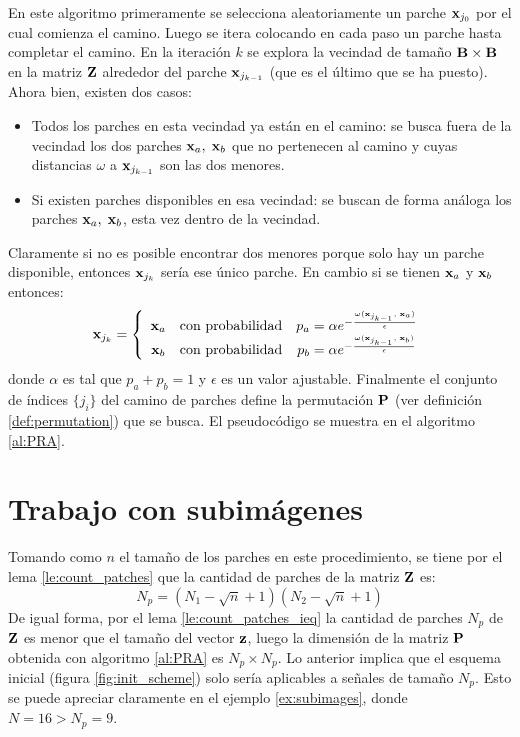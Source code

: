 En este algoritmo primeramente se selecciona aleatoriamente un parche $\x_{j_0}$ por el cual comienza el camino. Luego se itera colocando en cada paso un parche hasta completar el camino. En la iteraci\'on $k$ se explora la vecindad de tamaño $\B \times \B$ en la matriz $\Z$ alrededor del parche $\x_{j_{k - 1}}$ (que es el \'ultimo que se ha puesto). Ahora bien, existen dos casos:
\begin{itemize}
\item Todos los parches en esta vecindad ya están en el camino: se busca fuera de la vecindad los dos parches $\x_a,\; \x_b$ que no pertenecen al camino y cuyas distancias $\omega$ a $\x_{j_{k - 1}}$ son las dos menores.
\item Si existen parches disponibles en esa vecindad: se buscan de forma an\'aloga los parches $\x_a,\; \x_b$, esta vez dentro de la vecindad.
\end{itemize}
Claramente si no es posible encontrar dos menores porque solo hay un parche disponible, entonces $\x_{j_k}$ ser\'ia ese \'unico parche. En cambio si se tienen $\x_a$ y $\x_b$ entonces:
\begin{equation}
	\x_{j_k} = \left\{
		\begin{array}{ccc}
		\x_a &\mbox{con probabilidad}& p_a = \alpha e^{-\frac{\omega(\x_{j_{k - 1}},\; \x_a)}{\epsilon}}\\
		\x_b &\mbox{con probabilidad}& p_b = \alpha e^{-\frac{\omega(\x_{j_{k - 1}},\; \x_b)}{\epsilon}}\\
		\end{array}
	\right.
	\label{eq:choosing_patch}
\end{equation}
donde $\alpha$ es tal que $p_a + p_b = 1$ y $\epsilon$ es un valor ajustable. Finalmente el conjunto de \'indices $\{j_i\}$ del camino de parches define la permutaci\'on $\P$ (ver definici\'on \ref{def:permutation}) que se busca. El pseudoc\'odigo se muestra en el algoritmo \ref{al:PRA}.

\section{Trabajo con subim\'agenes}
Tomando como $n$ el tamaño de los parches en este procedimiento, se tiene por el lema \ref{le:count_patches} que la cantidad de parches de la matriz $\Z$ es: 
\begin{equation}
	N_p = (N_1 - \sqrt{n} + 1)(N_2 - \sqrt{n} + 1)
	\label{eq:patches}
\end{equation}
De igual forma, por el lema \ref{le:count_patches_ieq} la cantidad de parches $N_p$ de $\Z$ es menor que el tamaño del vector $\z$, luego la dimensi\'on de la matriz $\P$ obtenida con algoritmo \ref{al:PRA} es $N_p \times N_p$. Lo anterior implica que el esquema inicial (figura \ref{fig:init_scheme}) solo ser\'ia aplicables a señales de tamaño $N_p$. Esto se puede apreciar claramente en el ejemplo \ref{ex:subimages}, donde $N = 16 > N_p = 9$.

